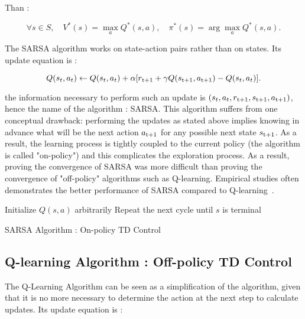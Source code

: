 Than :

\begin{equation}
\forall s \in S, \quad V^*(s) = \max_{a} Q^* (s,a ), \quad \pi^*(s) = \arg\max_{a} Q^*(s,a).
\end{equation}

The SARSA algorithm works on state-action pairs rather than on states. Its update equation is :

\begin{equation}
\label{eq:2.12}
Q(s_t, a_t) \leftarrow Q(s_t, a_t) + \alpha[r\textsubscript{t+1} + \gamma Q(s\textsubscript{t+1}, a\textsubscript{t+1}) - Q(s_t, a_t)].
\end{equation}

the information necessary to perform such an update is $(s_t, a_t, r\textsubscript{t+1}, s\textsubscript{t+1}, a\textsubscript{t+1})$, hence the name of the algorithm : SARSA. This algorithm suffers from one conceptual drawback: performing the updates as stated above implies knowing in advance what will be the next action $a\textsubscript{t+1}$ for any possible next state $s\textsubscript{t+1}$.  As a result, the learning process is tightly coupled to the current policy (the algorithm is called "on-policy") and this complicates the exploration process. As a result, proving the convergence of SARSA was more difficult than proving the convergence of "off-policy" algorithms such as Q-learning. Empirical studies often demonstrates the better performance of SARSA compared to Q-learning~\cite{Sigaud:2010:MDP:1841781}.

\begin{algorithm}
	Initialize $Q(s, a)$ arbitrarily\;
	Repeat the next cycle until $s$ is terminal\;
\caption{SARSA Algorithm : On-policy TD Control}
\end{algorithm}

\subsection{Q-learning Algorithm : Off-policy TD Control} The Q-Learning Algorithm can be seen as a simplification of the  algorithm, given that it is no more necessary to determine the action at the next step to calculate updates. Its update equation is :

